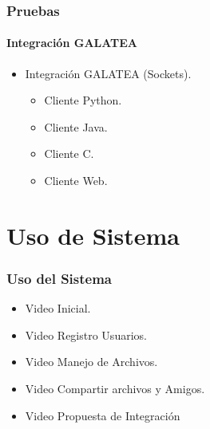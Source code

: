 \documentclass[spanish,xcolor=dvipsnames]{beamer}
\begin{document}
    \begin{frame}
    	\frametitle{Pruebas}
    	\framesubtitle{Integración GALATEA}
    	
    	\begin{itemize}
    		\item Integración GALATEA (Sockets).
    		\begin{itemize}
    			\item Cliente Python.
    			\item Cliente Java.
    			\item Cliente C.
    			\item Cliente Web.
    		\end{itemize}
    	\end{itemize}
    \end{frame}
    
    \section{Uso de Sistema}
    \begin{frame}
    	\frametitle{Uso del Sistema}
    	
    	\begin{itemize}
    		\item Video Inicial.
    		\item Video Registro Usuarios.
    		\item Video Manejo de Archivos.
    		\item Video Compartir archivos y Amigos.
    		\item Video Propuesta de Integración
    	\end{itemize}
    	
    \end{frame}
    
    
\end{document}
